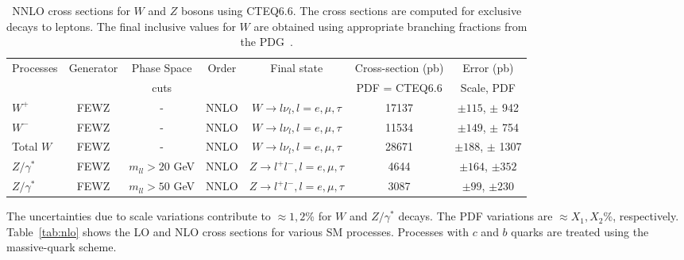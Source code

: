 \vspace{3mm}
\begin{table}[hbt]
\begin{center}
\renewcommand{\arraystretch}{1.2}
\begin{tabular}{|l|c|c|c|c|c|c|}\hline
Processes & Generator & Phase Space& Order & Final state & Cross-section (pb)& Error (pb) \\ 
 &  &  cuts & & & PDF = CTEQ6.6 & Scale, PDF \\ \hline
$W^+$ & FEWZ & - & NNLO & $W \rightarrow l \nu_l, l=e,\mu,\tau$ & 17137 & $\pm 115$, $\pm$ 942 \\ \hline
$W^-$ & FEWZ & - & NNLO & $W \rightarrow l \nu_l, l=e,\mu,\tau$ & 11534 & $\pm 149$, $\pm$ 754 \\ \hline
Total $W$ & FEWZ & - & NNLO & $W \rightarrow l \nu_l, l=e,\mu,\tau$ & 28671 & $\pm 188$, $\pm$ 1307 \\ \hline
$Z/\gamma^*$ & FEWZ & $m_{ll} > 20$ GeV & NNLO & $Z \rightarrow l^+l^-, l=e,\mu,\tau$ & 4644 & $\pm 164$, $\pm 352$ \\ \hline
$Z/\gamma^*$ & FEWZ & $m_{ll} > 50$ GeV & NNLO & $Z \rightarrow l^+l^-, l=e,\mu,\tau$ & 3087 & $\pm 99$, $\pm 230$ \\ \hline
\end{tabular} 
\caption{NNLO cross sections for $W$ and $Z$ bosons using CTEQ6.6. The cross sections are computed for
exclusive decays to leptons. The final inclusive values for $W$ are obtained using appropriate 
branching fractions from the PDG~\cite{pdg}. \label{tab:nnlo66}}
\end{center}
\end{table}


The uncertainties due to scale variations contribute to $\approx 1, 2$\% for 
$W$ and $Z/\gamma^*$ decays. The PDF variations are $\approx X_1, X_2$\%, 
respectively. Table~\ref{tab:nlo} shows the LO and NLO cross sections for 
various SM processes. Processes with $c$ and $b$ quarks are treated using the 
massive-quark scheme.

